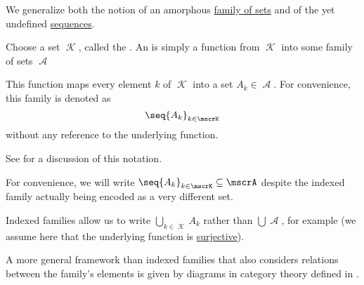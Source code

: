 \begin{definition}\label{def:indexed_family}
  We generalize both the notion of an amorphous \hyperref[rem:family_of_sets]{family of sets} and of the yet undefined \hyperref[def:sequence]{sequences}.

  Choose a set \( \mscrK \), called the . An  is simply a function from \( \mscrK \) into some family of sets \( \mscrA \)

  This function maps every element \( k \) of \( \mscrK \) into a set \( A_k \in \mscrA \). For convenience, this family is denoted as
  \begin{equation*}
    \seq{ A_k }_{k \in \mscrK}
  \end{equation*}
  without any reference to the underlying function.

  See  for a discussion of this notation.

  For convenience, we will write \( \seq{ A_k }_{k \in \mscrK} \subseteq \mscrA \) despite the indexed family actually being encoded as a very different set.

  Indexed families allow us to write \( \bigcup_{k \in \mscrK} A_k \) rather than \( \bigcup \mscrA \), for example (we assume here that the underlying function is \hyperref[def:function_invertibility/surjective]{surjective}).

  A more general framework than indexed families that also considers relations between the family's elements is given by diagrams in category theory defined in .
\end{definition}

